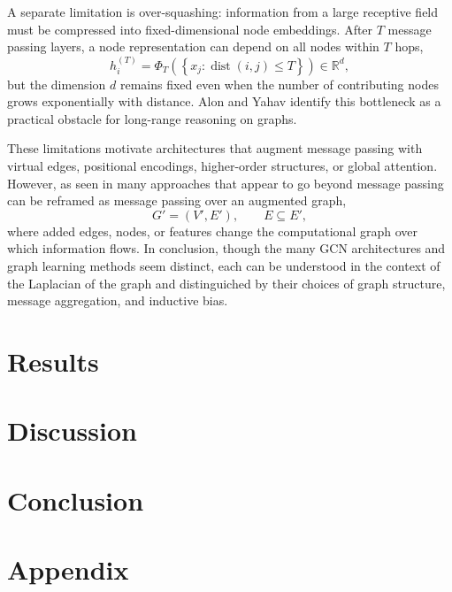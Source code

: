 \documentclass[11pt]{article}
\begin{document}
A separate limitation is over-squashing: information from a large receptive field must be compressed into fixed-dimensional node embeddings. After $T$ message passing layers, a node representation can depend on all nodes within $T$ hops,
\[
    h_i^{(T)}
    = \Phi_T\!\left(\left\{x_j : \operatorname{dist}(i,j)\leq T\right\}\right)
    \in \mathbb{R}^d,
\]
but the dimension $d$ remains fixed even when the number of contributing nodes grows exponentially with distance. Alon and Yahav \cite{alon2021bottleneck} identify this bottleneck as a practical obstacle for long-range reasoning on graphs.

These limitations motivate architectures that augment message passing with virtual edges, positional encodings, higher-order structures, or global attention.
However, as seen in \cite{velickovic2022message} many approaches that appear to go beyond message passing can be reframed as message passing over an augmented graph,
\[
    G' = (V',E'),
    \qquad
    E \subseteq E',
\]
where added edges, nodes, or features change the computational graph over which information flows.
In conclusion, though the many GCN architectures and graph learning methods seem distinct, each can be understood in the context of the Laplacian of the graph and distinguiched by their choices of graph structure, message aggregation, and inductive bias.

\section{Results}


\section{Discussion}

\section{Conclusion}

\section{Appendix}






\end{document}
